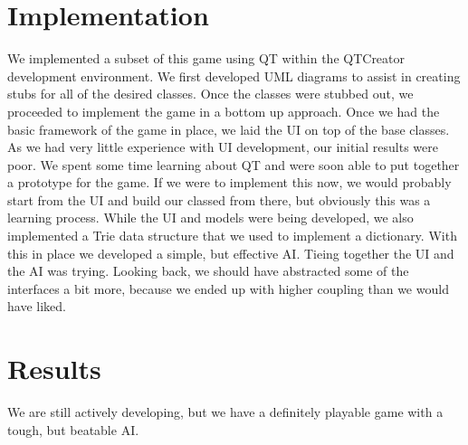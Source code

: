 \hypertarget{index_Implementation}{}\section{Implementation}\label{index_Implementation}
\begin{DoxyParagraph}{We implemented a subset of this game using Q\-T within the Q\-T\-Creator development environment. We first developed U\-M\-L diagrams to assist in creating stubs for all of the desired classes. Once the classes were stubbed out, we proceeded to implement the game in a bottom up approach. Once we had the basic framework of the game in place, we laid the U\-I on top of the base classes. As we had very little experience with U\-I development, our initial results were poor. We spent some time learning about Q\-T and were soon able to put together a prototype for the game. If we were to implement this now, we would probably start from the U\-I and build our classed from there, but obviously this was a learning process. While the U\-I and models were being developed, we also implemented a Trie data structure that we used to implement a dictionary. With this in place we developed a simple, but effective A\-I. Tieing together the U\-I and the A\-I was trying. Looking back, we should have abstracted some of the interfaces a bit more, because we ended up with higher coupling than we would have liked.}

\end{DoxyParagraph}
\hypertarget{index_Results}{}\section{Results}\label{index_Results}
\begin{DoxyParagraph}{We are still actively developing, but we have a definitely playable game with a tough, but beatable A\-I.}

\end{DoxyParagraph}
